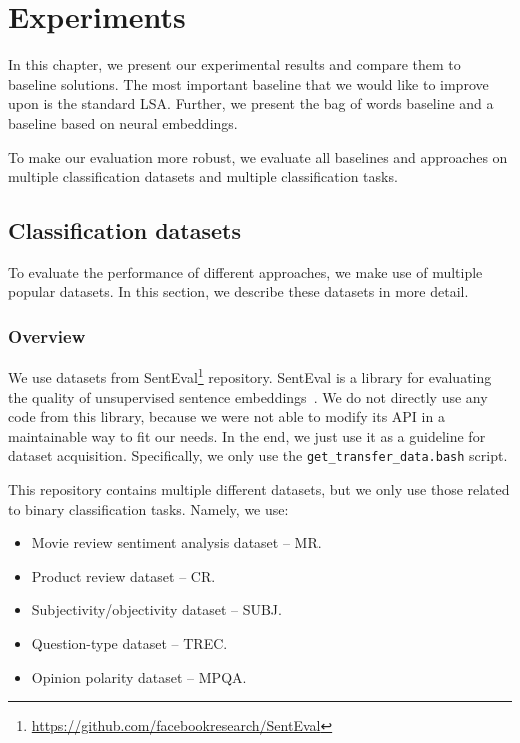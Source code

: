 \chapter{Experiments}

In this chapter, we present our experimental results and compare them to baseline solutions.
The most important baseline that we would like to improve upon is the standard LSA.
Further, we present the bag of words baseline and a baseline based on neural embeddings.

To make our evaluation more robust, we evaluate all baselines and approaches on multiple classification datasets and multiple classification tasks.

\section{Classification datasets}
    
    To evaluate the performance of different approaches, we make use of multiple popular datasets.
    In this section, we describe these datasets in more detail.
    
    \subsection{Overview} \label{sec:data:overview}
    
    We use datasets from  SentEval\footnote{\url{https://github.com/facebookresearch/SentEval}} repository.
    SentEval is a library for evaluating the quality of unsupervised sentence embeddings~\cite{conneau2017supervised}.
    We do not directly use any code from this library, because we were not able to modify its API in a maintainable way to fit our needs. 
    In the end, we just use it as a guideline for dataset acquisition.
    Specifically, we only use the \texttt{get\_transfer\_data.bash} script.
    
    This repository contains multiple different datasets, 
    but we only use those related to binary classification tasks.
    Namely, we use:
    \begin{itemize}
        \item Movie review sentiment analysis dataset -- MR.
        \item Product review dataset -- CR.
        \item Subjectivity/objectivity dataset -- SUBJ.
        \item Question-type dataset -- TREC.
        \item Opinion polarity dataset -- MPQA.
    \end{itemize}
    
